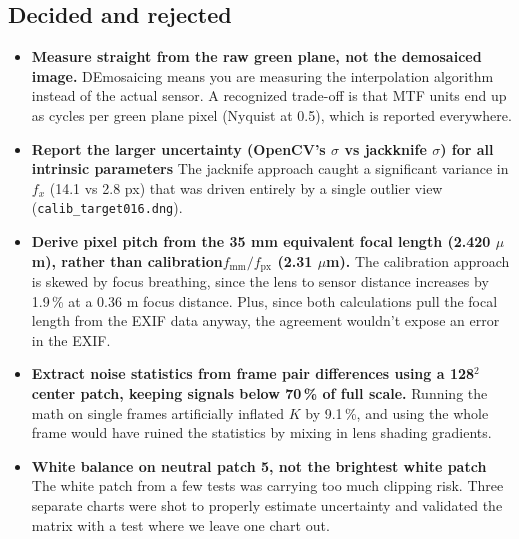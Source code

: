 \documentclass[9pt]{extarticle}
\begin{document}
\subsection{Decided and rejected}
\begin{itemize}
\item \textbf{Measure straight from the raw green plane, not the demosaiced image.} DEmosaicing means you are measuring the interpolation algorithm instead of the actual sensor. A recognized trade-off is that MTF units end up as cycles per green plane pixel (Nyquist at 0.5), which is reported everywhere.

\item \textbf{Report the larger uncertainty (OpenCV's $\sigma$ vs jackknife $\sigma$) for all intrinsic parameters } The jacknife approach caught a significant variance in $f_x$ (14.1 vs 2.8 px) that was driven entirely by a single outlier view (\texttt{calib\_target016.dng}).


\item \textbf{Derive pixel pitch from the 35 mm equivalent focal length (2.420 $\mu$m), rather than calibration$f_\mathrm{mm}/f_\mathrm{px}$ (2.31 $\mu$m).} The calibration approach is skewed by focus breathing, since the lens to sensor distance increases by 1.9\,\% at a 0.36 m focus distance. Plus, since both calculations pull the focal length from the EXIF data anyway, the agreement wouldn't expose an error in the EXIF.

\item \textbf{Extract noise statistics from frame pair differences using a 128$^2$ center patch, keeping signals below 70\,\% of full scale.} Running the math on single frames artificially inflated $K$ by 9.1\,\%, and using the whole frame would have ruined the statistics by mixing in lens shading gradients.

\item \textbf{White balance on neutral patch 5, not the brightest white patch} The white patch from a few tests was carrying too much clipping risk. Three separate charts were shot to properly estimate uncertainty and validated the matrix with a test where we leave one chart out.
\end{itemize}
\end{document}
